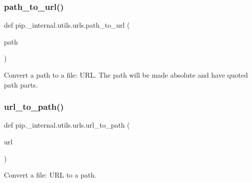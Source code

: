 \subsubsection{\texorpdfstring{path\+\_\+to\+\_\+url()}{path\_to\_url()}}
{\footnotesize\ttfamily def pip.\+\_\+internal.\+utils.\+urls.\+path\+\_\+to\+\_\+url (\begin{DoxyParamCaption}\item[{}]{path }\end{DoxyParamCaption})}

\begin{DoxyVerb}Convert a path to a file: URL.  The path will be made absolute and have
quoted path parts.
\end{DoxyVerb}
 \mbox{\label{namespacepip_1_1__internal_1_1utils_1_1urls_a3de8091daa436638c4e3104ba125beb6}} 
\subsubsection{\texorpdfstring{url\+\_\+to\+\_\+path()}{url\_to\_path()}}
{\footnotesize\ttfamily def pip.\+\_\+internal.\+utils.\+urls.\+url\+\_\+to\+\_\+path (\begin{DoxyParamCaption}\item[{}]{url }\end{DoxyParamCaption})}

\begin{DoxyVerb}Convert a file: URL to a path.
\end{DoxyVerb}
 